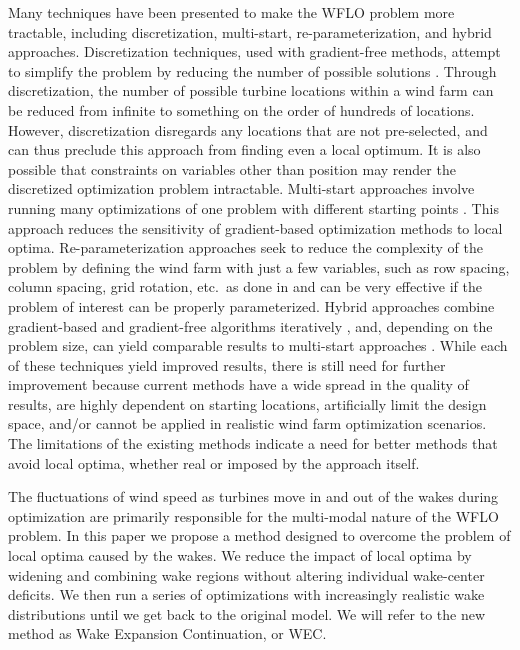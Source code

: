 \documentclass{jpconf}
\begin{document}
Many techniques have been presented to make the WFLO problem more tractable, including discretization, multi-start, re-parameterization, and hybrid approaches. Discretization techniques, used with gradient-free methods, attempt to simplify the problem by reducing the number of possible solutions \cite{mosetti1994, grady2005}. Through discretization, the number of possible turbine locations within a wind farm can be reduced from infinite to something on the order of hundreds of locations. However, discretization disregards any locations that are not pre-selected, and can thus preclude this approach from finding even a local optimum. It is also possible that constraints on variables other than position may render the discretized optimization problem intractable. Multi-start approaches involve running many optimizations of one problem with different starting points \cite{gonzalez2014,stanley2019-hub-height,thomas2018-wec,thomas2019-les-validation}. This approach reduces the sensitivity of gradient-based optimization methods to local optima. Re-parameterization approaches seek to reduce the complexity of the problem by defining the wind farm with just a few variables, such as row spacing, column spacing, grid rotation, etc.~as done in \cite{stanley2020} and can be very effective if the problem of interest can be properly parameterized. Hybrid approaches combine gradient-based and gradient-free algorithms iteratively \cite{rethore2014,graf2016, mittal2017}, and, depending on the problem size, can yield comparable results to multi-start approaches \cite{rethore2014}. While each of these techniques yield improved results, there is still need for further improvement because current methods have a wide spread in the quality of results, are highly dependent on starting locations, artificially limit the design space, and/or cannot be applied in realistic wind farm optimization scenarios. The limitations of the existing methods indicate a need for better methods that avoid local optima, whether real or imposed by the approach itself.

The fluctuations of wind speed as turbines move in and out of the wakes during optimization are primarily responsible for the multi-modal nature of the WFLO problem. In this paper we propose a method designed to overcome the problem of local optima caused by the wakes. We reduce the impact of local optima by widening and combining wake regions without altering individual wake-center deficits. We then run a series of optimizations with increasingly realistic wake distributions until we get back to the original model. We will refer to the new method as Wake Expansion Continuation, or WEC. 
\end{document}
